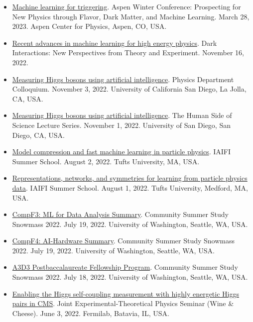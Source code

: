 \documentclass[11pt]{res}
\begin{document}
\begin{resume}
  \begin{itemize}
    \itemsep-0.3em
    \item \href{https://indico.fnal.gov/event/21471/contributions/259113/}{Machine learning for triggering}. Aspen Winter Conference: Prospecting for New Physics through Flavor, Dark Matter, and Machine Learning. March 28, 2023. Aspen Center for Physics, Aspen, CO, USA.
    \item \href{https://indico.cern.ch/event/1211501/contributions/5128872/}{Recent advances in machine learning for high energy physics}. Dark Interactions: New Perspectives from Theory and Experiment. November 16, 2022.
    \item \href{https://indico.cern.ch/event/1219204/}{Measuring Higgs bosons using artificial intelligence}. Physics Department Colloquium. November 3, 2022. University of California San Diego, La Jolla, CA, USA.
    \item \href{https://www.sandiego.edu/events/cas/detail.php?_focus=86860}{Measuring Higgs bosons using artificial intelligence}. The Human Side of Science Lecture Series. November 1, 2022. University of San Diego, San Diego, CA, USA.
    \item \href{https://iaifi.org/summer-school-agenda}{Model compression and fast machine learning in particle physics}. IAIFI Summer School. August 2, 2022. Tufts University, MA, USA.
    \item \href{https://iaifi.org/summer-school-agenda}{Representations, networks, and symmetries for learning from particle physics data}. IAIFI Summer School. August 1, 2022. Tufts University, Medford, MA, USA.
    \item \href{https://indico.fnal.gov/event/22303/contributions/245447}{CompF3: ML for Data Analysis Summary}. Community Summer Study Snowmass 2022. July 19, 2022. University of Washington, Seattle, WA, USA.
    \item \href{https://indico.fnal.gov/event/22303/contributions/245914}{CompF4: AI-Hardware Summary}. Community Summer Study Snowmass 2022. July 19, 2022. University of Washington, Seattle, WA, USA.
    \item \href{https://indico.fnal.gov/event/22303/contributions/244766}{A3D3 Postbaccalaureate Fellowship Program}. Community Summer Study Snowmass 2022. July 18, 2022. University of Washington, Seattle, WA, USA.
    \item \href{https://indico.fnal.gov/event/55499/}{Enabling the Higgs self-coupling measurement with highly energetic Higgs pairs in CMS}. Joint Experimental-Theoretical Physics Seminar (Wine \& Cheese). June 3, 2022. Fermilab, Batavia, IL, USA.

\end{itemize}
\end{resume}
\end{document}
